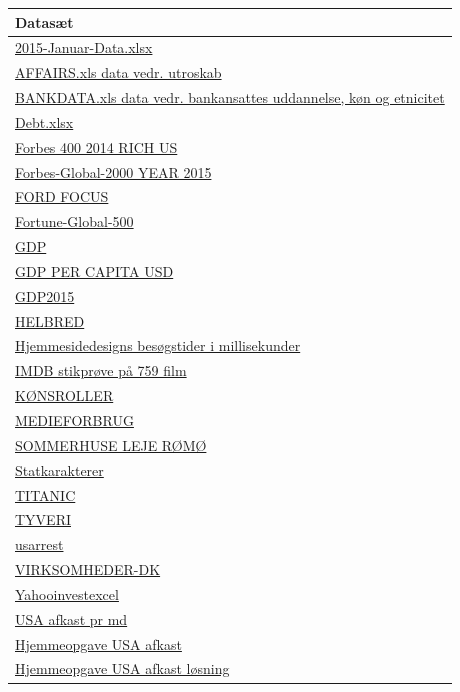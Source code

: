 \documentclass[]{book}
\begin{document}
\begin{longtable}[]{@{}l@{}}
\toprule
Datasæt\tabularnewline
\midrule
\endhead
\href{https://drive.google.com/uc?export=download\&id=0B1E7VnhxsDMldkt1OUx6LTEyMXM}{2015-Januar-Data.xlsx}\tabularnewline
\href{https://drive.google.com/uc?export=download\&id=0B1E7VnhxsDMlRlVQcFBtdVlHZ1U}{AFFAIRS.xls data vedr. utroskab}\tabularnewline
\href{https://drive.google.com/uc?export=download\&id=0B1E7VnhxsDMlRENKWWxlNlBXbmM}{BANKDATA.xls data vedr. bankansattes uddannelse, køn og etnicitet}\tabularnewline
\href{https://drive.google.com/uc?export=download\&id=0B1E7VnhxsDMlUGdpNXZjWm1sNk0}{Debt.xlsx}\tabularnewline
\href{https://drive.google.com/uc?export=download\&id=0B1E7VnhxsDMlYTRWVWozb09PRTQ}{Forbes 400 2014 RICH US}\tabularnewline
\href{https://drive.google.com/uc?export=download\&id=0B1E7VnhxsDMlNEdtLUV3NFJTSkk}{Forbes-Global-2000 YEAR 2015}\tabularnewline
\href{https://drive.google.com/uc?export=download\&id=0B1E7VnhxsDMlNTkzeVJlQV81OHM}{FORD FOCUS}\tabularnewline
\href{https://drive.google.com/uc?export=download\&id=0B1E7VnhxsDMlQm51dXNjM3NmdE0}{Fortune-Global-500}\tabularnewline
\href{https://drive.google.com/uc?export=download\&id=0B1E7VnhxsDMlQUhPbEgxdmJhZTg}{GDP}\tabularnewline
\href{https://drive.google.com/uc?export=download\&id=0B1E7VnhxsDMlSVkweHBpT19GZjg}{GDP PER CAPITA USD}\tabularnewline
\href{https://drive.google.com/uc?export=download\&id=0B1E7VnhxsDMlamdFSkk4SWU4eWM}{GDP2015}\tabularnewline
\href{https://drive.google.com/uc?export=download\&id=0B1E7VnhxsDMlMTM1UUNMdzdoUm8}{HELBRED}\tabularnewline
\href{https://drive.google.com/uc?export=download\&id=0B1E7VnhxsDMlS3Y5ZUhROU9iNnM}{Hjemmesidedesigns besøgstider i millisekunder}\tabularnewline
\href{https://drive.google.com/uc?export=download\&id=0B1E7VnhxsDMlWlFNLTVoMEU1WHM}{IMDB stikprøve på 759 film}\tabularnewline
\href{https://drive.google.com/uc?export=download\&id=0B1E7VnhxsDMlalR4TGdjSkV0RzA}{KØNSROLLER}\tabularnewline
\href{https://drive.google.com/uc?export=download\&id=0B1E7VnhxsDMlSTFXM1pCMUtjc2M}{MEDIEFORBRUG}\tabularnewline
\href{https://drive.google.com/uc?export=download\&id=0B1E7VnhxsDMlOWNjUzlQd0s4TVE}{SOMMERHUSE LEJE RØMØ}\tabularnewline
\href{https://drive.google.com/uc?export=download\&id=0B1E7VnhxsDMlRURnNjk0UnJSYzQ}{Statkarakterer}\tabularnewline
\href{https://drive.google.com/uc?export=download\&id=0B1E7VnhxsDMlYWJOOG5yamNoOTQ}{TITANIC}\tabularnewline
\href{https://drive.google.com/uc?export=download\&id=0B1E7VnhxsDMlMFZJdm5QdXpGTGc}{TYVERI}\tabularnewline
\href{https://drive.google.com/uc?export=download\&id=0B1E7VnhxsDMlRDhUYUk4R0NwVFk}{usarrest}\tabularnewline
\href{https://drive.google.com/uc?export=download\&id=0B1E7VnhxsDMlVmxHTDltNk1VSG8}{VIRKSOMHEDER-DK}\tabularnewline
\href{https://drive.google.com/uc?export=download\&id=0B1E7VnhxsDMlYnFpbWp1YTBlLVE}{Yahooinvestexcel}\tabularnewline
\href{https://drive.google.com/uc?export=download\&id=0B1E7VnhxsDMldVZtS2tzV0RqVjQ}{USA afkast pr md}\tabularnewline
\href{https://drive.google.com/uc?export=download\&id=0B1E7VnhxsDMlekM5eVRYZkdUZnc}{Hjemmeopgave USA afkast}\tabularnewline
\href{https://drive.google.com/uc?export=download\&id=0B1E7VnhxsDMlSDNPZi1zSTlqNk0}{Hjemmeopgave USA afkast løsning}\tabularnewline
\bottomrule
\end{longtable}
\end{document}
